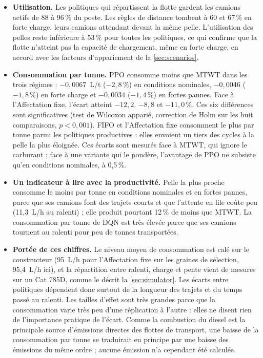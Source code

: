 \documentclass[11pt,a4paper]{article}
\newif\ifrevmarks
\newcommand{\revtag}[1]{\ifrevmarks\textsuperscript{\textcolor{red!70!black}{\scriptsize[#1]}}\fi}
\newenvironment{revbloc}[1]{\par\ifrevmarks\color{revcolor}\noindent\revtag{#1}\ \fi}{\par}
\newif\ifcorrmarks
\newcommand{\corr}[1]{\ifcorrmarks\textcolor{corrcolor}{#1}\else#1\fi}
\begin{document}
\begin{revbloc}{T31}
\begin{itemize}
  \item \textbf{Utilisation.} Les politiques qui répartissent la flotte gardent les camions actifs de 88 à 96\,\% du poste. Les règles de distance tombent à 60 et 67\,\% en forte charge, leurs camions attendant devant la même pelle. L'utilisation des pelles reste inférieure à 53\,\% pour toutes les politiques, ce qui confirme que la flotte n'atteint pas la capacité de chargement, même en forte charge, en accord avec les facteurs d'appariement de la \cref{sec:scenarios}.
  \item \textbf{Consommation par tonne.} PPO consomme moins que MTWT dans les trois régimes : $-0{,}0067$~L/t ($-2{,}8\,\%$) en conditions nominales, $-0{,}0046$ ($-1{,}8\,\%$) en forte charge et $-0{,}0034$ ($-1{,}4\,\%$) en fortes pannes. Face à l'Affectation fixe, l'écart atteint $-12{,}2$, $-8{,}8$ et $-11{,}0\,\%$. Ces six différences sont significatives (test de Wilcoxon apparié, correction de Holm sur les huit comparaisons, $p<0{,}001$). FIFO et l'Affectation fixe consomment le plus par tonne parmi les politiques productives : elles envoient un tiers des cycles à la pelle la plus éloignée. \corr{Ces écarts sont mesurés face à MTWT, qui ignore le carburant ; face à une variante qui le pondère, l'avantage de PPO ne subsiste qu'en conditions nominales, à 0,5\,\%.}
  \item \textbf{Un indicateur à lire avec la productivité.} Pelle la plus proche consomme le moins par tonne en conditions nominales et en fortes pannes, parce que ses camions font des trajets courts et que l'attente en file coûte peu (11,3~L/h au ralenti) ; elle produit pourtant 12\,\% de moins que MTWT. La consommation par tonne de DQN est très élevée parce que ses camions tournent au ralenti pour peu de tonnes transportées.
  \item \textbf{Portée de ces chiffres.} Le niveau moyen de consommation est calé sur le constructeur (95~L/h pour l'Affectation fixe sur les graines de sélection, 95,4~L/h ici), et la répartition entre ralenti, charge et pente vient de mesures sur un Cat 785D, comme le décrit la \cref{sec:simulator}. Les écarts entre politiques dépendent donc surtout de la longueur des trajets et du temps passé au ralenti. Les tailles d'effet sont très grandes parce que la consommation varie très peu d'une réplication à l'autre : elles ne disent rien de l'importance pratique de l'écart. Comme la combustion du diesel est la principale source d'émissions directes des flottes de transport, une baisse de la consommation par tonne se traduirait en principe par une baisse des émissions du même ordre ; aucune émission n'a cependant été calculée.
\end{itemize}
\end{revbloc}
\end{document}
